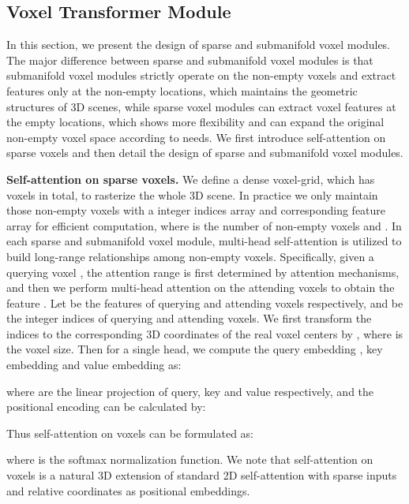 \documentclass[10pt,twocolumn,letterpaper]{article}
\begin{document}
\subsection{Voxel Transformer Module}
In this section, we present the design of sparse and submanifold voxel modules. The major difference between sparse and submanifold voxel modules is that submanifold voxel modules strictly operate on the non-empty voxels and extract features only at the non-empty locations, which maintains the geometric structures of 3D scenes, while sparse voxel modules can extract voxel features at the empty locations, which shows more flexibility and can expand the original non-empty voxel space according to needs. We first introduce self-attention on sparse voxels and then detail the design of sparse and submanifold voxel modules.

\textbf{Self-attention on sparse voxels.} We define a dense voxel-grid, which has  voxels in total, to rasterize the whole 3D scene. In practice we only maintain those non-empty voxels with a  integer indices array  and  corresponding feature array  for efficient computation, where  is the number of non-empty voxels and . In each sparse and submanifold voxel module, multi-head self-attention is utilized to build long-range relationships among non-empty voxels. Specifically, given a querying voxel , the attention range  is first determined by attention mechanisms, and then we perform multi-head attention on the attending voxels  to obtain the feature . Let  be the features of querying and attending voxels respectively, and  be the integer indices of querying and attending voxels. We first transform the indices  to the corresponding 3D coordinates of the real voxel centers  by , where  is the voxel size. Then for a single head, we compute the query embedding , key embedding  and value embedding  as:  

where  are the linear projection of query, key and value respectively, and the positional encoding  can be calculated by: 

Thus self-attention on voxels can be formulated as:

where  is the softmax normalization function. We note that self-attention on voxels is a natural 3D extension of standard 2D self-attention with sparse inputs and relative coordinates as positional embeddings.
\end{document}
